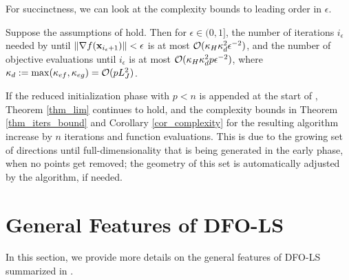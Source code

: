For succinctness, we can look at the complexity bounds to leading order in $\epsilon$. 

\begin{corollary} \label{cor_complexity}
	Suppose the assumptions of  hold.
	Then for $\epsilon\in(0,1]$, the number of iterations  $i_{\epsilon}$ needed by  until $\|\nabla f(\mathbf{x}_{i_{\epsilon}+1})\|< \epsilon$ is at most $\mathcal{O}(\kappa_H \kappa_d^2 \epsilon^{-2})$, and the number of objective evaluations until $i_{\epsilon}$ is at most $\mathcal{O}(\kappa_H \kappa_d^2 p \epsilon^{-2})$, where $\kappa_d:=\max(\kappa_{ef},\kappa_{eg})=\mathcal{O}(p L_J^2)$.
\end{corollary}

If the reduced initialization phase with $p<n$ is appended at the start of , Theorem \ref{thm_lim} continues to hold, and the complexity bounds in Theorem \ref{thm_iters_bound} 
and Corollary \ref{cor_complexity} for the resulting algorithm increase by $n$ iterations and function evaluations. This is due to the growing set of directions until full-dimensionality that is being generated in the early phase, when no points get removed; the geometry of this set is automatically adjusted by the algorithm, if needed. 





\section{General Features of DFO-LS} \label{sec_general_features_appendix}
In this section, we provide more details on the general features of DFO-LS summarized in .

